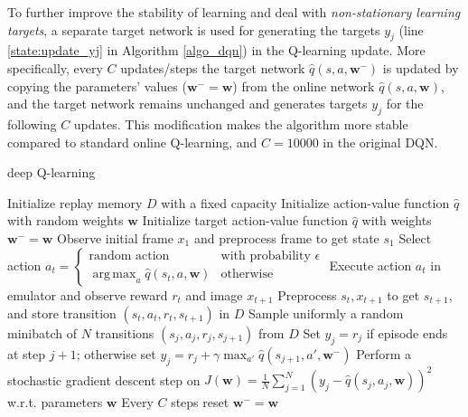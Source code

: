\documentclass{article}
\newcommand{\w}{\mathbf{w}}
\DeclareMathOperator*{\argmax}{arg\,max}
\begin{document}
To further improve the stability of learning and deal with \textit{non-stationary learning targets}, a separate target network is used for generating the targets $y_j$ (line \ref{state:update_yj} in Algorithm \ref{algo_dqn}) in the Q-learning update. More specifically, every $C$ updates/steps the target network $\hat{q}(s, a, \w^-)$ is updated by copying the parameters' values ($\w^- = \w$) from the online network $\hat{q}(s, a, \w)$, and the target network remains unchanged and generates targets $y_j$ for the following $C$ updates. This modification makes the algorithm more stable compared to standard online Q-learning, and $C = 10000$ in the original DQN.

\begin{algorithm}
\caption{deep Q-learning}\label{algo_dqn}
\begin{algorithmic}[1]
\State Initialize replay memory $D$ with a fixed capacity
\State Initialize action-value function $\hat{q}$ with random weights $\w$
\State Initialize target action-value function $\hat{q}$ with weights $\w^- = \w$
  \State Observe initial frame $x_1$ and preprocess frame to get state $s_1$
    \State Select action
      $ a_t = \begin{cases}
        \text{random action} & \text{with probability $\epsilon$} \\
        \argmax_a \hat{q}(s_t, a, \w) & \text{otherwise}
      \end{cases} $
    \State Execute action $a_t$ in emulator and observe reward $r_t$ and image $x_{t +1}$
    \State Preprocess $s_t, x_{t+1}$ to get $s_{t+1}$, and store transition $(s_t, a_t, r_t, s_{t+1})$ in $D$
    \State Sample uniformly a random minibatch of $N$ transitions $(s_j, a_j, r_j, s_{j+1})$ from $D$
    \State Set $y_j = r_j$ if episode ends at step $j+1$;
    \State otherwise set $y_j = r_j + \gamma \max_{a'} \hat{q}(s_{j+1}, a', \w^-)$ \label{state:update_yj}
    \State Perform a stochastic gradient descent step on $J(\w) = \frac{1}{N} \sum_{j = 1}^{N} (y_j - \hat{q} (s_j, a_j, \w))^2$ w.r.t. parameters $\w$
    \State Every $C$ steps reset $\w^- = \w$
  \EndFor
\EndFor
\end{algorithmic}
\end{algorithm}
\end{document}
